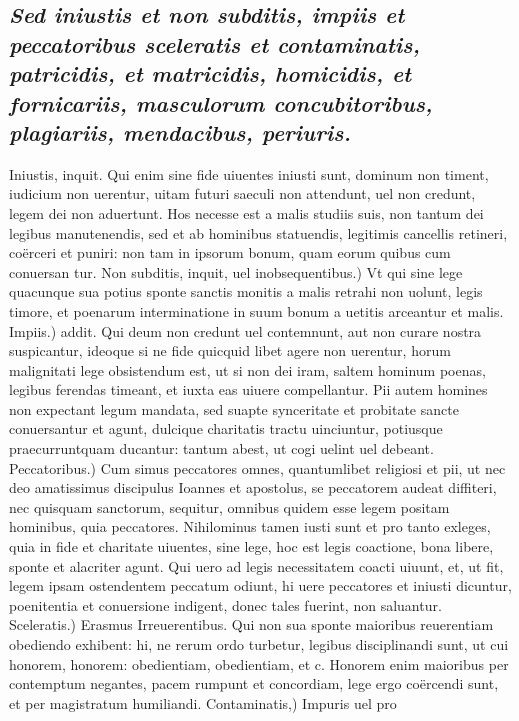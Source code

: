 \documentclass{article}
\begin{document}
\begin{pages}
\subsection*{\textit{Sed iniustis et non subditis, impiis et peccatoribus sceleratis et contaminatis, patricidis, et matricidis, homicidis, et fornicariis, masculorum concubitoribus, plagiariis, mendacibus, periuris. }}\pstart Iniustis, inquit. Qui enim sine fide uiuentes iniusti sunt, dominum non timent, iudicium non uerentur, uitam futuri saeculi non attendunt, uel non credunt, legem dei non aduertunt. Hos necesse est a malis studiis suis, non tantum dei legibus manutenendis, sed et ab hominibus statuendis, legitimis cancellis retineri, coërceri et puniri: non tam in ipsorum bonum, quam eorum quibus cum conuersan tur. Non subditis, inquit, uel inobsequentibus.) Vt qui sine lege quacunque sua potius sponte sanctis monitis a malis retrahi non uolunt, legis timore, et poenarum interminatione in suum bonum a uetitis arceantur et malis. Impiis.) addit. Qui deum non credunt uel contemnunt, aut non curare nostra suspicantur, ideoque si ne fide quicquid libet agere non uerentur, horum malignitati lege obsistendum est, ut si non dei iram, saltem hominum poenas, legibus ferendas timeant, et iuxta eas uiuere compellantur. Pii autem homines non expectant legum mandata, sed suapte synceritate et probitate sancte conuersantur et agunt, dulcique charitatis tractu uinciuntur, potiusque praecurruntquam ducantur: tantum abest, ut cogi uelint uel debeant. Peccatoribus.) Cum simus peccatores omnes, quantumlibet religiosi et pii, ut nec deo amatissimus discipulus Ioannes et apostolus, se peccatorem audeat diffiteri, nec quisquam sanctorum, sequitur, omnibus quidem esse legem positam hominibus, quia peccatores. Nihilominus tamen iusti sunt et pro tanto exleges, quia in fide et charitate uiuentes, sine lege, hoc est legis coactione, bona libere, sponte et alacriter agunt. Qui uero ad legis necessitatem coacti uiuunt, et, ut fit, legem ipsam ostendentem peccatum odiunt, hi uere peccatores et iniusti dicuntur, poenitentia et conuersione indigent, donec tales fuerint, non saluantur. Sceleratis.) Erasmus Irreuerentibus. Qui non sua sponte maioribus reuerentiam obediendo exhibent: hi, ne rerum ordo turbetur, legibus disciplinandi sunt, ut cui honorem, honorem: obedientiam, obedientiam, et c. Honorem enim maioribus per contemptum negantes, pacem rumpunt et concordiam, lege ergo coërcendi sunt, et per magistratum humiliandi. Contaminatis,) Impuris uel pro\pend

\end{pages}
\end{document}
